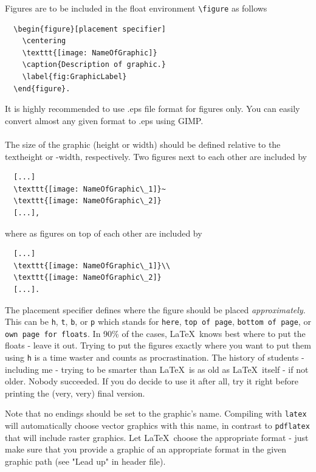 \documentclass[../main.tex]{subfiles}
\begin{document}
Figures are to be included in the float environment \verb!\figure! as follows

\begin{verbatim}
  \begin{figure}[placement specifier]
    \centering
    \texttt{[image: NameOfGraphic]}
    \caption{Description of graphic.}
    \label{fig:GraphicLabel}
  \end{figure}.
\end{verbatim}

It is highly recommended to use .eps file format for figures only. You can easily convert almost any given format to .eps using GIMP.\\
\linebreak\\
The size of the graphic (height or width) should be defined relative to the
textheight or -width, respectively. Two figures next to each other are
included by 

\begin{verbatim}
  [...]
  \texttt{[image: NameOfGraphic\_1]}~
  \texttt{[image: NameOfGraphic\_2]}
  [...],
\end{verbatim}
where as figures on top of each other are included by

\begin{verbatim}
  [...]
  \texttt{[image: NameOfGraphic\_1]}\\
  \texttt{[image: NameOfGraphic\_2]}
  [...].
\end{verbatim}

The placement specifier defines where the figure should be placed
\emph{approximately}. This can be \verb!h!, \verb!t!, \verb!b!, or \verb!p!
which stands for \verb!here!, \verb!top of page!, \verb!bottom of page!, or
\verb!own page for floats!. In 90\% of the cases, \LaTeX~knows best where to
put the floats - leave it out. Trying to put the figures exactly where you
want to put them using \verb!h! is a time waster and counts as
procrastination. The history of students - including me - trying to be smarter
than \LaTeX~is as old as \LaTeX~itself - if not older. Nobody succeeded. 
If you do decide to use it after all, try it right before printing the (very, very) final version.

Note that no endings should be set to the graphic's name. Compiling with
\verb!latex! will automatically choose vector graphics with this name, in
contrast to \verb!pdflatex! that will include raster graphics. Let
\LaTeX~choose the appropriate format - just make sure that you provide a
graphic of an appropriate format in the given graphic path (see "Lead up" in
header file).
\end{document}
